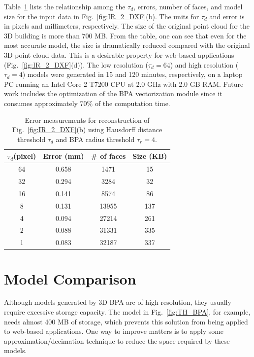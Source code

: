 \documentclass[review]{acmsiggraph}       %
\newcommand{\Fig}[1]{Fig.~\ref{fig:#1}}
\newcommand{\Tbl}[1]{Table~\ref{tbl:#1}}
\newcommand{\Figb}[1]{Fig.~\ref{fig:#1}(b)}
\newcommand{\Figd}[1]{Fig.~\ref{fig:#1}(d)}
\begin{document}
\Tbl{em} lists the relationship among the $\tau_d$, errors,
number of faces, and model size for the input data in \Figb{IR_2_DXF}.
The units for $\tau_d$ and error is in pixels and millimeters, respectively.
The size of the original point cloud for the 3D building is more than 700 MB.
From the table, one can see that even for the most accurate model, the size
is dramatically reduced compared with the original 3D point cloud data.
This is a desirable property for web-based applications (\Figd{IR_2_DXF}).
The low resolution ($\tau_d = 64$) and high resolution ($\tau_d = 4$) models
were generated in 15 and 120 minutes, respectively,
on a laptop PC running an Intel Core 2 T7200 CPU at 2.0 GHz with 2.0 GB RAM.
Future work includes the optimization of the BPA vectorization module since
it consumes approximately 70\% of the computation time.

\setlength{\tabcolsep}{4pt}
\begin{table}[hbtp]
\begin{center}
\begin{tabular}[t]{||c||c|c|c||}
\hline
$\tau_{d} $(pixel) & Error (mm)& \# of faces & Size (KB) \\ \hline \hline
64 & 0.658 & 1471  & 15  \\ \hline
32 & 0.294 & 3284  & 32  \\ \hline
16 & 0.141 & 8574  & 86  \\ \hline
8  & 0.131 & 13955 & 137 \\ \hline
4  & 0.094 & 27214 & 261 \\ \hline
2  & 0.088 & 31331 & 335 \\ \hline
1  & 0.083 & 32187 & 337 \\ \hline
\end{tabular}
\end{center}
\caption{Error measurements for reconstruction of \Figb{IR_2_DXF} using
Hausdorff distance threshold $\tau_d$ and BPA radius threshold $\tau_r = 4$.}
\label{tbl:em}
\end{table}
\setlength{\tabcolsep}{1.4pt}

\section{Model Comparison}

Although models generated by 3D BPA are of high resolution, they usually
require excessive storage capacity.
The model in \Fig{TH_BPA}, for example, needs almost 400 MB of storage,
which prevents this solution from being applied to web-based applications.
One way to improve matters is to apply some approximation/decimation
technique to reduce the space required by these models.
\end{document}
